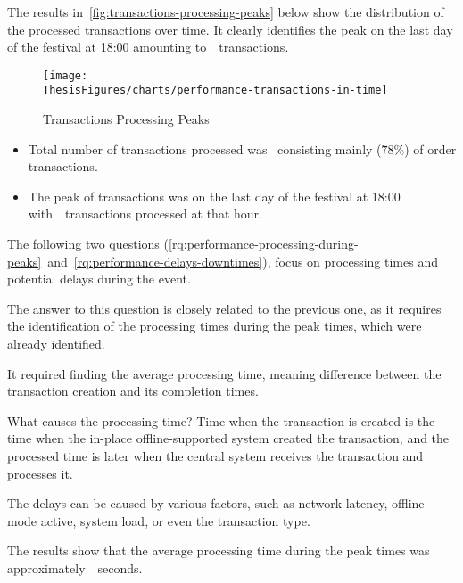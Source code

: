 The results in~\autoref{fig:transactions-processing-peaks} below show the distribution of the processed transactions over time.
It clearly identifies the peak on the last day of the festival at 18:00 amounting to~~transactions.

\begin{figure}[H]
	\centering
	\texttt{[image: \\ThesisFigures/charts/performance-transactions-in-time]}
	\caption{Transactions Processing Peaks}
	\label{fig:transactions-processing-peaks}
	\source
\end{figure}

\begin{keytakeaways}
	\begin{itemize}
		\item Total number of transactions processed was~ consisting mainly (7̃8\%) of order transactions.
		\item The peak of transactions was on the last day of the festival at 18:00 with~~transactions processed at that hour.
	\end{itemize}
\end{keytakeaways}

The following two questions (\autoref{rq:performance-processing-during-peaks}~and~\autoref{rq:performance-delays-downtimes}), focus on processing times and potential delays during the event.


The answer to this question is closely related to the previous one, as it requires the identification of the processing times during the peak times, which were already identified.

It required finding the average processing time, meaning difference between the transaction creation and its completion times.

\begin{infobox}{What causes the processing time?}
	Time when the transaction is created is the time when the in-place offline-supported system created the transaction, and the processed time is later when the central system receives the transaction and processes it.

	The delays can be caused by various factors, such as network latency, offline mode active, system load, or even the transaction type.
\end{infobox}

The results show that the average processing time during the peak times was approximately~~seconds.

